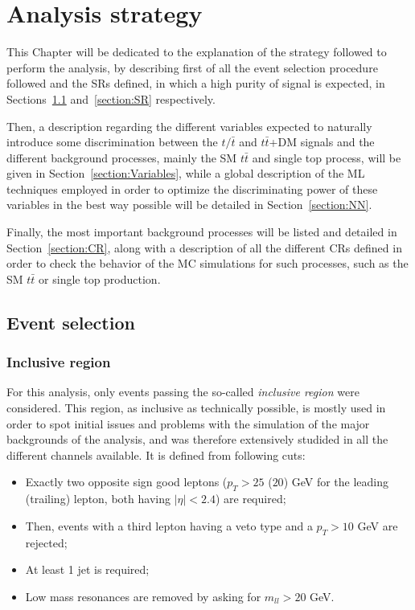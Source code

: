 \documentclass[a4paper, 10pt, openright]{report}
\begin{document}
\chapter{Analysis strategy} \label{chapter:Strategy}

This Chapter will be dedicated to the explanation of the strategy followed to perform the analysis, by describing first of all the event selection procedure followed and the \acfp{SR} defined, in which a high purity of signal is expected, in Sections~\ref{section:EventSel} and~\ref{section:SR} respectively.

Then, a description regarding the different variables expected to naturally introduce some discrimination between the $t/\bar t$ and $t \bar t$+DM signals and the different background processes, mainly the \ac{SM} $t \bar t$ and single top process, will be given in Section~\ref{section:Variables}, while a global description of the \ac{ML} techniques employed in order to optimize the discriminating power of these variables in the best way possible will be detailed in Section~\ref{section:NN}.

Finally, the most important background processes will be listed and detailed in Section~\ref{section:CR}, along with a description of all the different \acfp{CR} defined in order to check the behavior of the \ac{MC} simulations for such processes, such as the \ac{SM} $t \bar t$ or single top production. 

\section{Event selection} \label{section:EventSel}

\subsection{Inclusive region} \label{section:inclusiveCR}

For this analysis, only events passing the so-called \textit{inclusive region} were considered. This region, as inclusive as technically possible, is mostly used in order to spot initial issues and problems with the simulation of the major backgrounds of the analysis, and was therefore extensively studided in all the different channels available. It is defined from following cuts:

\begin{itemize}
\item Exactly two opposite sign good leptons ($p_T > 25$ ($20$) GeV for the leading (trailing) lepton, both having $|\eta| < 2.4$) are required;
\item Then, events with a third lepton having a veto type and a $p_T > 10$ GeV are rejected;
\item At least 1 jet is required;
\item Low mass resonances are removed by asking for $m_{ll} > 20$ GeV.
\end{itemize}
\end{document}
